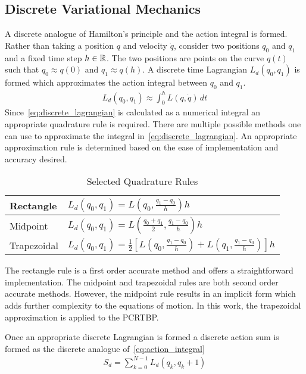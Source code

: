 \documentclass[letterpaper, preprint, paper,11pt]{AAS}	%
\begin{document}
\subsection{Discrete Variational Mechanics}
A discrete analogue of Hamilton's principle and the action integral is formed.
Rather than taking a position \( q \) and velocity \( \dot{q} \), consider two positions \( q_0 \) and \( q_1 \) and a fixed time step \( h \in \mathbb{R} \).
The two positions are points on the curve \( q(t) \) such that \( q_0 \approx q(0) \) and \( q_1 \approx q(h) \).
A discrete time Lagrangian \( L_d( q_0, q_1) \) is formed which approximates the action integral between \( q_0 \) and \( q_1 \). 
\begin{align}\label{eq:discrete_lagrangian}
	L_d\left( q_0 , q_1 \right) \approx \int_{0}^{h} L \left( q , \dot{q} \right) \, dt
\end{align}
Since~\cref{eq:discrete_lagrangian} is calculated as a numerical integral an appropriate quadrature rule is required.
There are multiple possible methods one can use to approximate the integral in~\cref{eq:discrete_lagrangian}.
An appropriate approximation rule is determined based on the ease of implementation and accuracy desired.
\begin{table}[htbp]
\begin{center}\begin{tabular}{l|l}Rectangle & \( L_d(q_0,q_1) =L(q_0,\frac{q_1-q_0}{h}) h \)  \\ \hline
Midpoint & \( L_d(q_0,q_1) = L(\frac{q_0 + q_1}{2},\frac{q_1 - q_0}{h}) h \) \\ \hline
Trapezoidal & \( L_d(q_0, q_1) = \frac{1}{2} \left[ L(q_0, \frac{q_1 - q_0}{h} ) + L(q_1, \frac{q_1 - q_0 }{h} )\right] h \)
\end{tabular} 
\caption{Selected Quadrature Rules}
\end{center}
\label{tab:quadrature}
\end{table}
The rectangle rule is a first order accurate method and offers a straightforward implementation.
The midpoint and trapezoidal rules are both second order accurate methods. 
However, the midpoint rule results in an implicit form which adds further complexity to the equations of motion.
In this work, the trapezoidal approximation is applied to the PCRTBP.

Once an appropriate discrete Lagrangian is formed a discrete action sum is formed as the discrete analogue of~\cref{eq:action_integral}
\begin{align}\label{eq:action_sum}
	S_d = \sum_{k=0}^{N-1} L_d(q_k, q_k+1)
\end{align}
\end{document}
